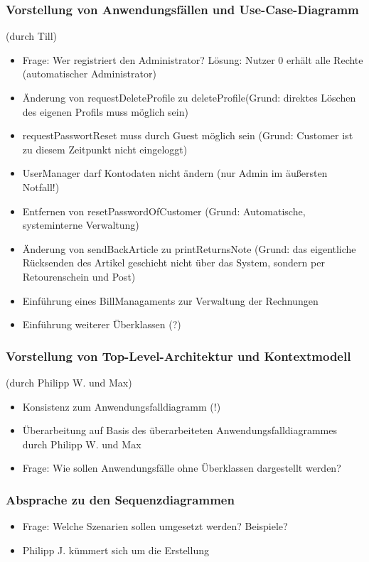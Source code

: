 \documentclass[12pt,a4paper]{article}
\begin{document}
\subsubsection*{Vorstellung von Anwendungsfällen und Use-Case-Diagramm}
(durch Till) 
\begin{itemize}
\item Frage: Wer registriert den Administrator? Lösung: Nutzer 0 erhält alle Rechte (automatischer Administrator)
\item Änderung von requestDeleteProfile zu deleteProfile(Grund: direktes Löschen des eigenen Profils muss möglich sein)
\item requestPasswortReset muss durch Guest möglich sein (Grund: Customer ist zu diesem Zeitpunkt nicht eingeloggt)
\item UserManager darf Kontodaten nicht ändern (nur Admin im äußersten Notfall!)
\item Entfernen von resetPasswordOfCustomer (Grund: Automatische, systeminterne Verwaltung)
\item Änderung von sendBackArticle zu printReturnsNote (Grund: das eigentliche Rücksenden des Artikel geschieht nicht über das System, sondern per Retourenschein und Post) 
\item Einführung eines BillManagaments zur Verwaltung der Rechnungen
\item Einführung weiterer Überklassen (?)
\end{itemize}

\subsubsection*{Vorstellung von Top-Level-Architektur und Kontextmodell}
(durch Philipp W. und Max)
\begin{itemize}
\item Konsistenz zum Anwendungsfalldiagramm (!)
\item Überarbeitung auf Basis des überarbeiteten Anwendungsfalldiagrammes durch Philipp W. und Max
\item Frage: Wie sollen Anwendungsfälle ohne Überklassen dargestellt werden?
\end{itemize}

\subsubsection*{Absprache zu den Sequenzdiagrammen}
\begin{itemize}
\item Frage: Welche Szenarien sollen umgesetzt werden? Beispiele?
\item Philipp J. kümmert sich um die Erstellung
\end{itemize}
\end{document}
